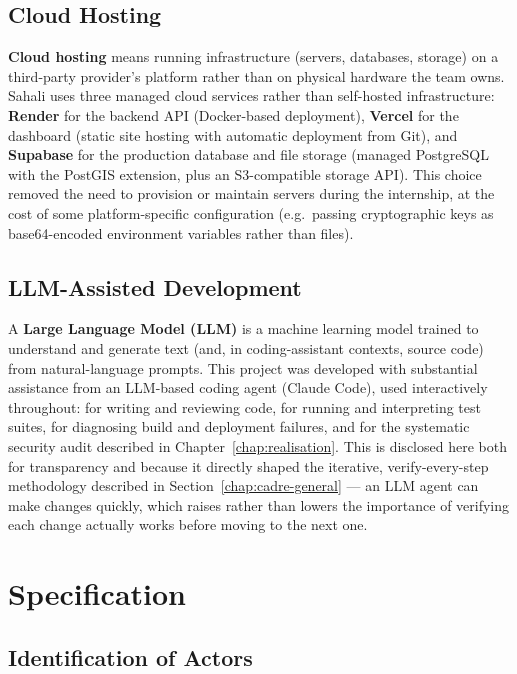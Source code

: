 \subsection{Cloud Hosting}

\textbf{Cloud hosting} means running infrastructure (servers, databases, storage) on a third-party provider's platform rather than on physical hardware the team owns. Sahali uses three managed cloud services rather than self-hosted infrastructure: \textbf{Render} for the backend API (Docker-based deployment), \textbf{Vercel} for the dashboard (static site hosting with automatic deployment from Git), and \textbf{Supabase} for the production database and file storage (managed PostgreSQL with the PostGIS extension, plus an S3-compatible storage API). This choice removed the need to provision or maintain servers during the internship, at the cost of some platform-specific configuration (e.g.\ passing cryptographic keys as base64-encoded environment variables rather than files).

\subsection{LLM-Assisted Development}

A \textbf{Large Language Model (LLM)} is a machine learning model trained to understand and generate text (and, in coding-assistant contexts, source code) from natural-language prompts. This project was developed with substantial assistance from an LLM-based coding agent (Claude Code), used interactively throughout: for writing and reviewing code, for running and interpreting test suites, for diagnosing build and deployment failures, and for the systematic security audit described in Chapter~\ref{chap:realisation}. This is disclosed here both for transparency and because it directly shaped the iterative, verify-every-step methodology described in Section~\ref{chap:cadre-general} --- an LLM agent can make changes quickly, which raises rather than lowers the importance of verifying each change actually works before moving to the next one.

\section{Specification}

\subsection{Identification of Actors}


